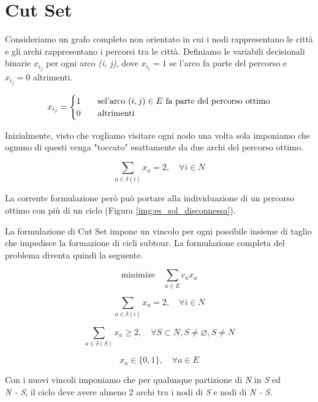 \section{Cut Set}
Consideriamo un grafo completo non orientato in cui i nodi rappresentano le città e gli archi rappresentano i percorsi tra le città. Definiamo le variabili decisionali binarie \begin{math}x_{i_j}\end{math} per ogni arco \textit{(i, j)}, dove \begin{math}x_{i_j} = 1\end{math} se l'arco fa parte del percorso e \begin{math}x_{i_j} = 0\end{math} altrimenti. 

\[ x_{i_j} =
  \begin{cases}
    1       & \quad \text{se} \text{l'arco \begin{math}(i, j) \in E\end{math} fa parte del percorso ottimo}\\
    0  & \quad \text{altrimenti}
  \end{cases}
\]

Inizialmente, visto che vogliamo visitare ogni nodo una volta sola imponiamo che ognuno di questi venga "toccato" esattamente da due archi del percorso ottimo.

\[
\sum_{a \in \delta(i)} x_a = 2, \quad \forall i \in N
\]

La corrente formulazione però può portare alla individuazione di un percorso ottimo con più di un ciclo (Figura \ref{img:es_sol_disconnessa}).

La formulazione di Cut Set impone un vincolo per ogni possibile insieme di taglio che impedisce la formazione di cicli subtour. La formulazione completa del problema diventa quindi la seguente.


\[
\text{minimize} \quad \sum_{a \in E} c_a x_a
\]

\[
\sum_{a \in \delta(i)} x_a = 2, \quad \forall i \in N
\]

\[
\sum_{a \in \delta(S)} x_a \geq 2, \quad \forall S \subset N, S \ne \varnothing, S \ne N
\]

\[
x_a \in \{0, 1\}, \quad \forall a \in E
\]

Con i nuovi vincoli imponiamo che per qualunque partizione di \textit{N} in \textit{S} ed \\ \textit{N - S}, il ciclo deve 
avere almeno 2 archi tra i nodi di \textit{S} e nodi di \textit{N - S}.

